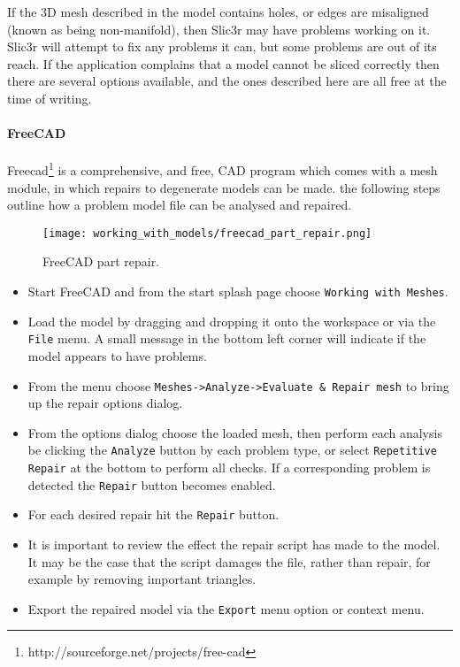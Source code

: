 
If the 3D mesh described in the model contains holes, or edges are misaligned (known as being non-manifold), then Slic3r may have problems working on it.  Slic3r will attempt to fix any problems it can, but some problems are out of its reach.  If the application complains that a model cannot be sliced correctly then there are several options available, and the ones described here are all free at the time of writing.

\paragraph{FreeCAD} %
\label{par:freecad}

Freecad\footnote{http://sourceforge.net/projects/free-cad} is a comprehensive, and free, CAD program which comes with a mesh module, in which repairs to degenerate models can be made.  the following steps outline how a problem model file can be analysed and repaired.

\begin{figure}[H]
\centering
\texttt{[image: working\_with\_models/freecad\_part\_repair.png]}
\caption{FreeCAD part repair.}
\label{fig:freecad_part_repair}
\end{figure}

\begin{itemize}
	\item Start FreeCAD and from the start splash page choose \texttt{Working with Meshes}.
	\item Load the model by dragging and dropping it onto the workspace or via the \texttt{File} menu.  A small message in the bottom left corner will indicate if the model appears to have problems.
	\item From the menu choose \texttt{Meshes->Analyze->Evaluate \& Repair mesh} to bring up the repair options dialog.
	\item From the options dialog choose the loaded mesh, then perform each analysis be clicking the \texttt{Analyze} button by each problem type, or select \texttt{Repetitive Repair} at the bottom to perform all checks.  If a corresponding problem is detected the \texttt{Repair} button becomes enabled.
	\item For each desired repair hit the \texttt{Repair} button.
	\item It is important to review the effect the repair script has made to the model.  It may be the case that the script damages the file, rather than repair, for example by removing important triangles.
	\item Export the repaired model via the \texttt{Export} menu option or context menu.
\end{itemize}
